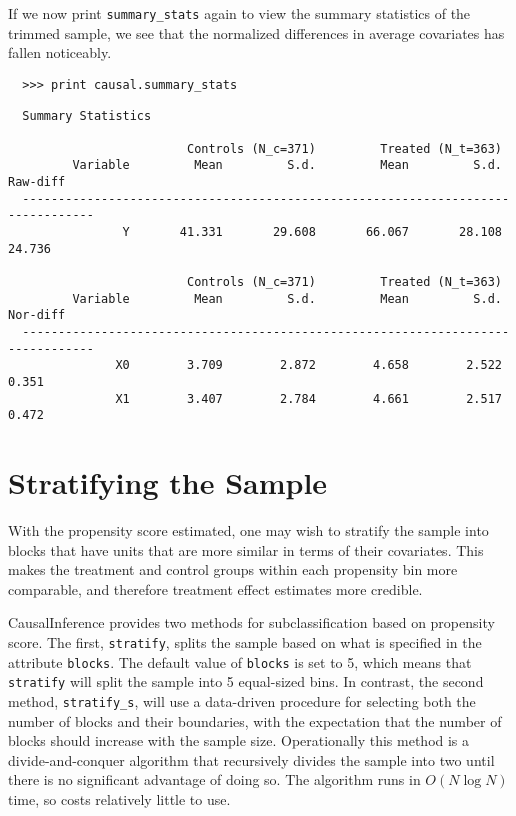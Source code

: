 \documentclass[12pt]{article}
\theoremstyle{definition}
\theoremstyle{definition}
\theoremstyle{definition}
\theoremstyle{remark}
\begin{document}
If we now print \texttt{summary\_stats} again to view the summary statistics of the trimmed sample, we see that the normalized differences in average covariates has fallen noticeably.
\begin{verbatim}
  >>> print causal.summary_stats
\end{verbatim}
\begin{verbatim}
  Summary Statistics
  
                         Controls (N_c=371)         Treated (N_t=363)             
         Variable         Mean         S.d.         Mean         S.d.     Raw-diff
  --------------------------------------------------------------------------------
                Y       41.331       29.608       66.067       28.108       24.736
  
                         Controls (N_c=371)         Treated (N_t=363)             
         Variable         Mean         S.d.         Mean         S.d.     Nor-diff
  --------------------------------------------------------------------------------
               X0        3.709        2.872        4.658        2.522        0.351
               X1        3.407        2.784        4.661        2.517        0.472
\end{verbatim}


\section{Stratifying the Sample} \label{sec.e}

With the propensity score estimated, one may wish to stratify the sample into blocks that have units that are more similar in terms of their covariates. This makes the treatment and control groups within each propensity bin more comparable, and therefore treatment effect estimates more credible.

CausalInference provides two methods for subclassification based on propensity score. The first, \texttt{stratify}, splits the sample based on what is specified in the attribute \texttt{blocks}. The default value of \texttt{blocks} is set to 5, which means that \texttt{stratify} will split the sample into 5 equal-sized bins. In contrast, the second method, \texttt{stratify\_s}, will use a data-driven procedure for selecting both the number of blocks and their boundaries, with the expectation that the number of blocks should increase with the sample size. Operationally this method is a divide-and-conquer algorithm that recursively divides the sample into two until there is no significant advantage of doing so. The algorithm runs in $O(N \log N)$ time, so costs relatively little to use. 
\end{document}
